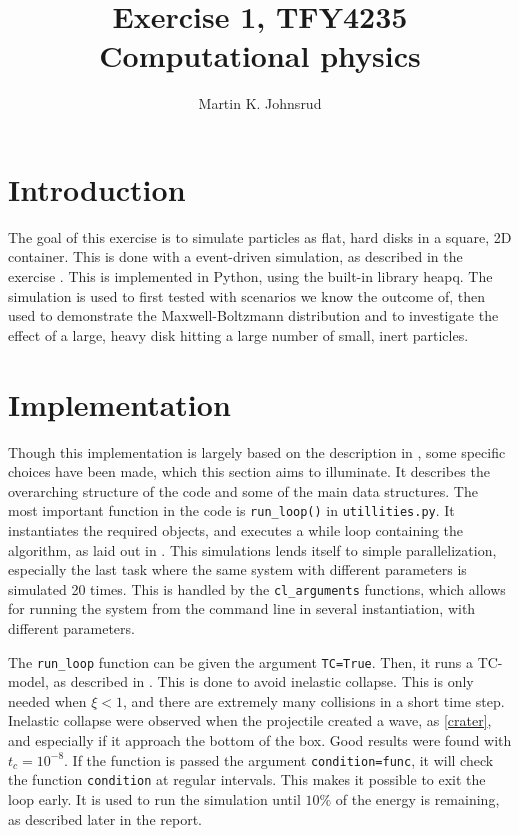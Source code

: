 \documentclass{article}
\title{Exercise 1, TFY4235 Computational physics}
\author{Martin K. Johnsrud}
\date{}
\begin{document}
    \maketitle
    \section*{Introduction}
    The goal of this exercise is to simulate particles as flat, hard disks in a square, 2D container.
    This is done with a event-driven simulation, as described in the exercise \cite{exercise}.
    This is implemented in Python, using the built-in library heapq.
    The simulation is used to first tested with scenarios we know the outcome of, then used to demonstrate the Maxwell-Boltzmann distribution and to investigate the effect of a large, heavy disk hitting a large number of small, inert particles.

    \section*{Implementation}
    Though this implementation is largely based on the description in \cite{exercise}, some specific choices have been made, which this section aims to illuminate.
    It describes the overarching structure of the code and some of the main data structures.
    The most important function in the code is \verb|run_loop()| in \verb|utillities.py|.
    It instantiates the required objects, and executes a while loop containing the algorithm, as laid out in \cite{exercise}.
    This simulations lends itself to simple parallelization, especially the last task where the same system with different parameters is simulated 20 times.
    This is handled by the \verb|cl_arguments| functions, which allows for running the system from the command line in several instantiation, with different parameters.
    
    The \verb|run_loop| function can be given the argument \verb|TC=True|.
    Then, it runs a TC-model, as described in \cite{TC}.
    This is done to avoid inelastic collapse.
    This is only needed when $\xi<1$, and there are extremely many collisions in a short time step.
    Inelastic collapse were observed when the projectile created a wave, as \autoref{crater}, and especially if it approach the bottom of the box.
    Good results were found with $t_c = 10^{-8}$.
    If the function is passed the argument \verb|condition=func|, it will check the function \verb|condition| at regular intervals.
    This makes it possible to exit the loop early.
    It is used to run the simulation until $10\%$ of the energy is remaining, as described later in the report.
\end{document}
